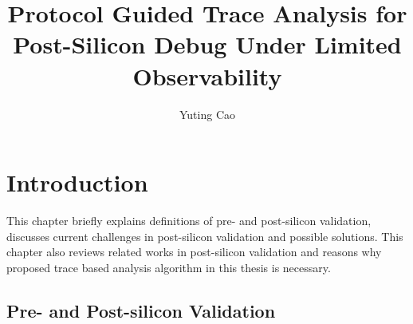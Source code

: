 \documentclass[12pt,frontmatter,copyright,thesis]{usfmanus}
\title{Protocol Guided Trace Analysis for Post-Silicon Debug Under Limited Observability}
\author{Yuting Cao}
\begin{document}
\setlength{\abovedisplayskip}{1pt}
\setlength{\belowdisplayskip}{2pt}
\chapter{Introduction}
This chapter briefly explains definitions of pre- and post-silicon validation,
discusses current challenges in post-silicon validation and possible
solutions. This chapter also reviews
related works in post-silicon validation and
reasons why proposed trace based analysis algorithm in this thesis is
necessary.
%
\section{Pre- and Post-silicon Validation}
\end{document}
